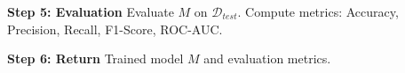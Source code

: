 \documentclass[a4paper]{article}
\begin{document}
\begin{algorithm}
\begin{algorithmic}[1]
\State \textbf{Step 5: Evaluation}
    \State Evaluate $ M $ on $ \mathcal{D}_{test} $.
    \State Compute metrics: Accuracy, Precision, Recall, F1-Score, ROC-AUC.

\State \textbf{Step 6: Return}
    \State \Return Trained model $ M $ and evaluation metrics.
\end{algorithmic}
\end{algorithm}
\end{document}
